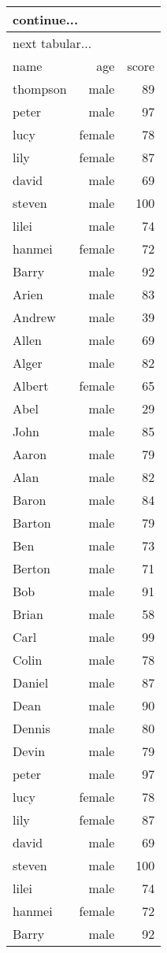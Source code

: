\documentclass{article}
\begin{document}
\begin{longtable}{l r r}
\endfirsthead
\multicolumn{2}{l}{continue...}\\
\hline
\endhead
\hline
\multicolumn{2}{l}{next tabular...}\\
\endfoot
\endlastfoot
name & age & score\\\hline
thompson & male & 89 \\
peter & male & 97\\
lucy & female & 78\\
lily & female & 87\\
david & male & 69\\
steven & male & 100\\
lilei & male & 74\\
hanmei & female & 72\\
Barry & male & 92\\
Arien & male & 83\\
Andrew &male & 39\\
Allen & male & 69\\
Alger & male & 82\\
Albert & female & 65\\
Abel & male & 29\\
John & male & 85\\
Aaron & male & 79\\
Alan & male & 82\\
Baron & male & 84\\
Barton & male & 79\\
Ben & male & 73\\
Berton & male & 71\\
Bob & male & 91\\
Brian & male & 58\\
Carl & male & 99\\
Colin & male & 78\\
Daniel & male & 87\\
Dean & male & 90\\
Dennis & male & 80\\
Devin & male & 79\\
peter & male & 97\\
lucy & female & 78\\
lily & female & 87\\
david & male & 69\\
steven & male & 100\\
lilei & male & 74\\
hanmei & female & 72\\
Barry & male & 92\\

\end{longtable}
\end{document}
